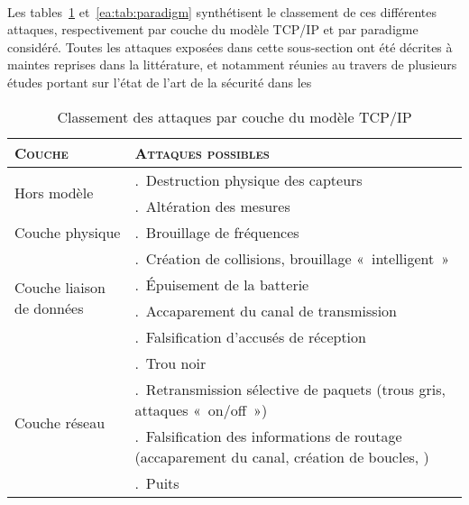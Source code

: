         \paragraph{}
Les tables~\ref{ea:tab:layer} et~\ref{ea:tab:paradigm} synthétisent le classement de ces différentes attaques, respectivement par couche du modèle TCP/IP et par paradigme considéré.
Toutes les attaques exposées dans cette sous-section ont été décrites à maintes reprises dans la littérature, et notamment réunies au travers de plusieurs études portant sur l'état de l'art de la sécurité dans les \rcs~\cite{SSS11,RM11,AD14}
\begin{table}[!ht]
    \setcounter{LayerNumber}{1}
    \newcommand\num[1]{\theLayerNumber.~#1\stepcounter{LayerNumber}}
    \caption{Classement des attaques par couche du modèle TCP/IP}\label{ea:tab:layer}
    \centering
    \medskip
    \begin{small}
        \begin{tabular}{m{}|p{}}
            \toprule
            \textsc{Couche} & \textsc{Attaques possibles}\\
            \midrule
            \multirow{2}{*}{Hors modèle}%
                & \num{Destruction physique des capteurs}\\
                & \num{Altération des mesures}\\
            \midrule
            \multirow{1}{*}{Couche physique}%
                & \num{Brouillage de fréquences}\\
            \midrule
            \multirow{4}{*}{\parbox{.2\textwidth}{Couche liaison de données}}%
                & \num{Création de collisions, brouillage « intelligent »}\\
                & \num{Épuisement de la batterie}\\
                & \num{Accaparement du canal de transmission}\\
                & \num{Falsification d'accusés de réception}\\
            \midrule
            \multirow{8}{*}{Couche réseau}%
                & \num{Trou noir}\\
                & \num{Retransmission sélective de paquets (trous gris, attaques « on/off »)}\\
                & \num{Falsification des informations de routage (accaparement du canal, création de boucles, \etc)}\\
                & \num{Puits}\\

\end{tabular}
\end{small}
\end{table}
